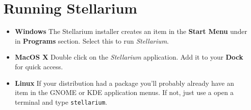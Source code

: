 \section{Running Stellarium}

\begin{itemize}
\item
  \textbf{Windows} The Stellarium installer creates an item in the
  \textbf{Start Menu} under in \textbf{Programs} section. Select this to
  run \emph{Stellarium}.
\item
  \textbf{MacOS X} Double click on the \emph{Stellarium} application.
  Add it to your \textbf{Dock} for quick access.
\item
  \textbf{Linux} If your distribution had a package you'll probably
  already have an item in the GNOME or KDE application menus. If not,
  just use a open a terminal and type \texttt{stellarium}.
\end{itemize}